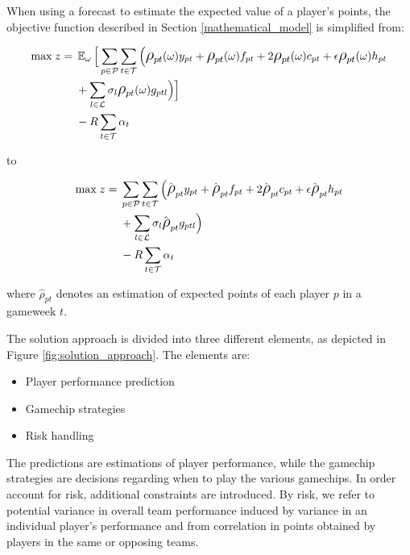 \newpar


When using a forecast to estimate the expected value of a player's points, the objective function described in Section \ref{mathematical_model} is simplified from: 

\begin{equation*}
\smaller
\begin{aligned}
\text{max} \; z ={} & \EX_{\omega} \Big\lbrack\sum\limits_{p \in \mathcal{P}} \sum\limits_{t \in \mathcal{T}} \Big( \mathlarger{\rho}_{pt}(\omega)y_{pt} + \mathlarger{\rho}_{pt}(\omega)f_{pt} + 2 \mathlarger{\rho}_{pt}(\omega)c_{pt} + \epsilon  \mathlarger{\rho}_{pt}(\omega)h_{pt} \\ 
& + \sum_{l \in \mathcal{L}}\sigma_{l} \mathlarger{\rho}_{pt}(\omega)g_{ptl} \Big)  \Big\rbrack \\ 
& - R\sum_{t \in \mathcal{T}}\alpha_{t}
\end{aligned}
\end{equation*}

to 

\begin{equation*}
\smaller
\begin{aligned}
\text{max} \; z ={} &  \sum\limits_{p \in \mathcal{P}} \sum\limits_{t \in \mathcal{T}} \Big( \hat{\mathlarger{\rho}}_{pt} y_{pt} + \hat{\mathlarger{\rho}}_{pt} f_{pt} + 2 \hat{\mathlarger{\rho}}_{pt} c_{pt} + \epsilon  \hat{\mathlarger{\rho}}_{pt} h_{pt} \\ 
& + \sum_{l \in \mathcal{L}}\sigma_{l} \hat{\mathlarger{\rho}}_{pt} g_{ptl} \Big)  \\ 
& - R\sum_{t \in \mathcal{T}}\alpha_{t}
\end{aligned}
\end{equation*}


where $\hat{\rho}_{pt}$ denotes an estimation of expected points of each player $p$ in a gameweek $t$.

\newpar

The solution approach is divided into three different elements, as depicted in Figure \ref{fig:solution_approach}. The elements are:

\begin{itemize}
    \item Player performance prediction
    \item Gamechip strategies
    \item Risk handling
\end{itemize}

The predictions are estimations of player performance, while the gamechip strategies are decisions regarding when to play the various gamechips. In order account for risk, additional constraints are introduced. By risk, we refer to potential variance in overall team performance induced by variance in an individual player's performance and from correlation in points obtained by players in the same or opposing teams.


